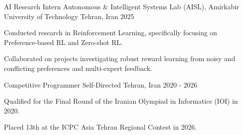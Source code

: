 

\begin{cventries}

  \cventry
    {AI Research Intern} %
    {Autonomous \& Intelligent Systems Lab (AISL), Amirkabir University of Technology} %
    {Tehran, Iran} %
    {2025} %
    {
      \begin{cvitems} %
        \item {Conducted research in Reinforcement Learning, specifically focusing on Preference-based RL and Zero-shot RL.}
        \item {Collaborated on projects investigating robust reward learning from noisy and conflicting preferences and multi-expert feedback.}
      \end{cvitems}
    }

  \cventry
    {Competitive Programmer} %
    {Self-Directed} %
    {Tehran, Iran} %
    {2020 - 2026} %
    {
      \begin{cvitems} %
        \item {Qualified for the Final Round of the Iranian Olympiad in Informatics (IOI) in 2020.}
        \item {Placed 13th at the ICPC Asia Tehran Regional Contest in 2026.}
      \end{cvitems}
    }

\end{cventries}
